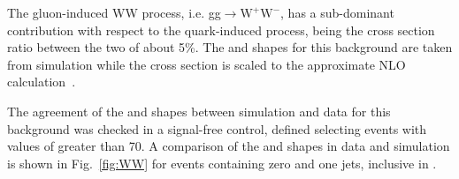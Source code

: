 The gluon-induced WW process, i.e. gg$\to \mathrm{W^{+}W^{-}}$, has a sub-dominant contribution with respect to the quark-induced process, being the cross section ratio between the two of about 5\%. The \mll and \mt shapes for this background are taken from simulation while the cross section is scaled to the approximate NLO calculation~\cite{Bonvini:2013jha,Passarino:2013bha}.

The agreement of the \mll and \mt shapes between simulation and data for this background was checked in a signal-free control, defined selecting events with values of \mll greater than 70\GeV. A comparison of the \mll and \mt shapes in data and simulation is shown in Fig.~\ref{fig:WW} for events containing zero and one jets, inclusive in \pth.

\begin{figure}[htb]
\centering
{}
\\
\end{figure}
